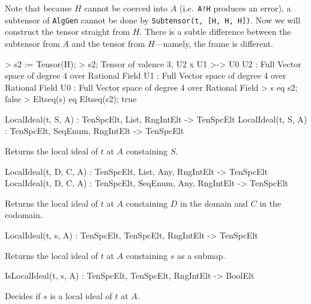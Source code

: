 \begin{example}[Subtensors]
Note that because $H$ cannot be coerced into $A$ (i.e.\ \texttt{A!H} produces an error), a subtensor of \texttt{AlgGen} cannot be done by \texttt{Subtensor(t, [H, H, H])}. 
Now we will construct the tensor straight from $H$. 
There is a subtle difference between the subtensor from $A$ and the tensor from $H$---namely, the frame is different.
\begin{code}
> s2 := Tensor(H);
> s2;
Tensor of valence 3, U2 x U1 >-> U0
U2 : Full Vector space of degree 4 over Rational Field
U1 : Full Vector space of degree 4 over Rational Field
U0 : Full Vector space of degree 4 over Rational Field
> s eq s2;
false
> Eltseq(s) eq Eltseq(s2);
true
\end{code}
\end{example}


\begin{intrinsics}
LocalIdeal(t, S, A) : TenSpcElt, List, {RngIntElt} -> TenSpcElt
LocalIdeal(t, S, A) : TenSpcElt, SeqEnum, {RngIntElt} -> TenSpcElt
\end{intrinsics}

Returns the local ideal of $t$ at $A$ constaining $S$.

\begin{intrinsics}
LocalIdeal(t, D, C, A) : TenSpcElt, List, Any, {RngIntElt} -> TenSpcElt
LocalIdeal(t, D, C, A) : TenSpcElt, SeqEnum, Any, {RngIntElt} -> TenSpcElt
\end{intrinsics}

Returns the local ideal of $t$ at $A$ constaining $D$ in the domain and $C$ 
in the codomain.

\begin{intrinsics}
LocalIdeal(t, s, A) : TenSpcElt, TenSpcElt, {RngIntElt} -> TenSpcElt
\end{intrinsics}

Returns the local ideal of $t$ at $A$ constaining $s$ as a submap.


\begin{intrinsics}
IsLocalIdeal(t, s, A) : TenSpcElt, TenSpcElt, {RngIntElt} -> BoolElt
\end{intrinsics}

Decides if $s$ is a local ideal of $t$ at $A$.

